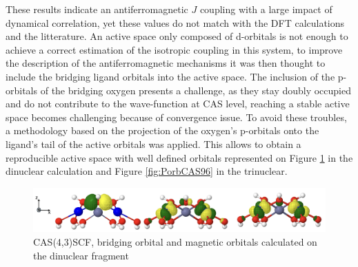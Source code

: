 \documentclass[12pt]{report}
\numberwithin{equation}{section}
\begin{document}
These results indicate an antiferromagnetic $J$ coupling with a large impact of dynamical correlation, yet these values do not match with the DFT calculations and the litterature.
An active space only composed of d-orbitals is not enough to achieve a correct estimation of the isotropic coupling in this system, to improve the description of the antiferromagnetic mechanisms it was then thought to include the bridging ligand orbitals into the active space.
The inclusion of the p-orbitals of the bridging oxygen presents a challenge, as they stay doubly occupied and do not contribute to the wave-function at CAS level, reaching a stable active space becomes challenging because of convergence issue.
To avoid these troubles, a methodology based on the projection of the oxygen's p-orbitals onto the ligand's tail of the active orbitals was applied.
This allows to obtain a reproducible active space with well defined orbitals represented on Figure \ref{fig:Porb} in the dinuclear calculation and Figure \ref{fig:PorbCAS96} in the trinuclear.

\begin{figure}[!ht]
    \centering
    \includegraphics[width=\textwidth]{Images/OrbCAS43.png}
    \caption{CAS(4,3)SCF, bridging orbital and magnetic orbitals calculated on the dinuclear fragment}
    \label{fig:Porb}
\end{figure}
\end{document}
